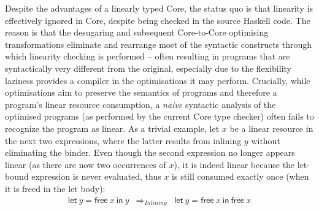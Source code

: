 \documentclass[acmsmall,review,anonymous,screen]{acmart}
\newcommand{\llet}[2]{\mathsf{let}~#1~\mathsf{in}~#2}
\begin{document}

%

Despite the advantages of a linearly typed Core, the status quo is
that linearity is effectively ignored in Core, despite being checked
in the source Haskell code. The reason is that the desugaring
and subsequent Core-to-Core optimising transformations
eliminate and rearrange most of the syntactic constructs through
which linearity checking is performed -- often resulting in programs
that are syntactically very different from the original, especially
due to the flexibility laziness provides a compiler in the
optimisations it may perform.
%
Crucially, while optimisations aim to preserve the semantics of
programs and therefore a program's linear resource consumption,
a \emph{naive} syntactic analysis of the optimised programs (as
performed by the current Core type checker) often fails to recognize
the program as linear.
%
As a trivial example, let $x$ be a linear resource in the next two expressions,
where the latter results from inlining $y$ without eliminating the binder. Even
though the second expression no longer appears linear (as there are now two occurrences
of $x$), it is indeed linear because the let-bound expression is never
evaluated, thus $x$ is still consumed exactly once (when it is freed in the let body):
%
\[
\begin{array}{ccc}
\llet{y = \textsf{free}~x}{y} & \Longrightarrow_{Inlining} & \llet{y = \textsf{free}~x}{\textsf{free}~x}
\end{array}
\]
\end{document}

